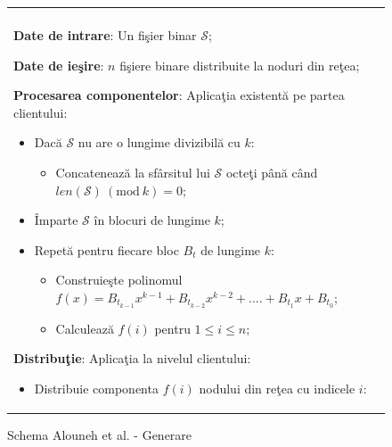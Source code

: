 \documentclass{llncs}
\newcommand{\Mod}[1]{\ (\text{mod}\ #1)}
\begin{document}
\begin{figure}[h!]

\begin{tabular}{|p{\textwidth}|}
\hline

\\
\hspace{.1in}
\textbf{Date de intrare}: Un fi\c{s}ier binar $\mathcal{S}$;
\medskip

\hspace{.1in}
\textbf{Date de ie\c{s}ire}: $n$ fi\c{s}iere binare distribuite la noduri din re\c{t}ea;
\medskip

\hspace{.1in}
\textbf{Procesarea componentelor}: Aplica\c{t}ia existent\u{a} pe partea clientului: 
	\begin{itemize}
		\item Dac\u{a} $\mathcal{S}$ nu are o lungime divizibil\u{a} cu $k$:
			\begin{itemize}
			\item Concateneaz\u{a} la sf\^{a}rsitul lui $\mathcal{S}$ octe\c{t}i p\^{a}n\u{a} c\^{a}nd $len(\mathcal{S}) \Mod k = 0$;
			\end{itemize}
		\item \^{I}mparte $\mathcal{S}$ \^{i}n blocuri de lungime $k$;
		\item Repet\u{a} pentru fiecare bloc $B_t$ de lungime $k$:
		\begin{itemize}
			\item Construie\c{s}te polinomul $f(x) = B_{t_{k - 1}}x ^ {k-1} + B_{t_{k - 2}}x ^ {k - 2} + .... + B_{t_1}x + B_{t_0}$;
			\item Calculeaz\u{a} $f(i)$ pentru $1 \leq i \leq n$;
		\end{itemize}
	\end{itemize}

\hspace{.1in}
\textbf{Distribu\c{t}ie}: Aplica\c{t}ia la nivelul clientului:
	\begin{itemize}
		\item Distribuie componenta $f(i)$ nodului din re\c{t}ea cu indicele $i$:
	\end{itemize}

\\
\hline
\end{tabular}
\caption{Schema Alouneh et al. - Generare \cite{AAMK:2013}}
\label{fig:alouneh_distribution}
\end{figure}
\end{document}
